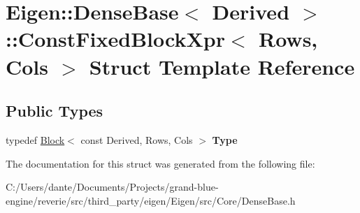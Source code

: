 \hypertarget{struct_eigen_1_1_dense_base_1_1_const_fixed_block_xpr}{}\section{Eigen\+::Dense\+Base$<$ Derived $>$\+::Const\+Fixed\+Block\+Xpr$<$ Rows, Cols $>$ Struct Template Reference}
\label{struct_eigen_1_1_dense_base_1_1_const_fixed_block_xpr}
\subsection*{Public Types}
\begin{DoxyCompactItemize}
\item 
\mbox{\label{struct_eigen_1_1_dense_base_1_1_const_fixed_block_xpr_a83a94551dfc89f107fdf64b50395f6db}} 
typedef \mbox{\hyperlink{class_eigen_1_1_block}{Block}}$<$ const Derived, Rows, Cols $>$ {\bfseries Type}
\end{DoxyCompactItemize}


The documentation for this struct was generated from the following file\+:\begin{DoxyCompactItemize}
\item 
C\+:/\+Users/dante/\+Documents/\+Projects/grand-\/blue-\/engine/reverie/src/third\+\_\+party/eigen/\+Eigen/src/\+Core/Dense\+Base.\+h\end{DoxyCompactItemize}
